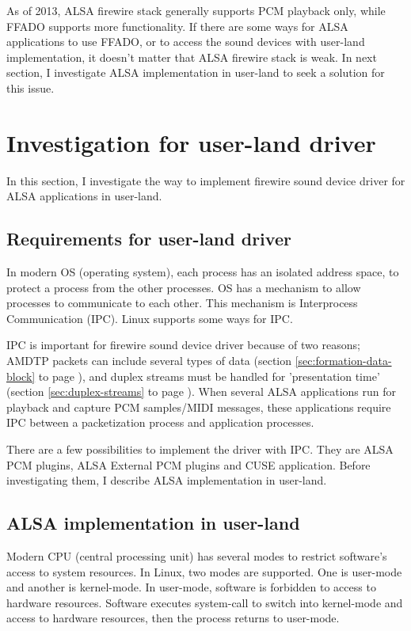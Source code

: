 \documentclass[onecolumn]{article}
\begin{document}
As of 2013, ALSA firewire stack generally supports PCM playback only, while FFADO supports more functionality. If there are some ways for ALSA applications to use FFADO, or to access the sound devices with user-land implementation, it doesn't matter that ALSA firewire stack is weak. In next section, I investigate ALSA implementation in user-land to seek a solution for this issue.


\section{Investigation for user-land driver}

In this section, I investigate the way to implement firewire sound device driver for ALSA applications in user-land.

\subsection{Requirements for user-land driver}

In modern OS (operating system), each process has an isolated address space, to protect a process from the other processes. OS has a mechanism to allow processes to communicate to each other. This mechanism is Interprocess Communication (IPC). Linux supports some ways for IPC.

IPC is important for firewire sound device driver because of two reasons; AMDTP packets can include several types of data (section \ref{sec:formation-data-block} to page \pageref{sec:formation-data-block}), and duplex streams must be handled for 'presentation time' (section \ref{sec:duplex-streams} to page \pageref{sec:duplex-streams}). When several ALSA applications run for playback and capture PCM samples/MIDI messages, these applications require IPC between a packetization process and application processes.

There are a few possibilities to implement the driver with IPC. They are ALSA PCM plugins, ALSA External PCM plugins and CUSE application. Before investigating them, I describe ALSA implementation in user-land.

\subsection{ALSA implementation in user-land}

Modern CPU (central processing unit) has several modes to restrict software's access to system resources. In Linux, two modes are supported. One is user-mode and another is kernel-mode. In user-mode, software is forbidden to access to hardware resources. Software executes system-call to switch into kernel-mode and access to hardware resources, then the process returns to user-mode.
\end{document}
